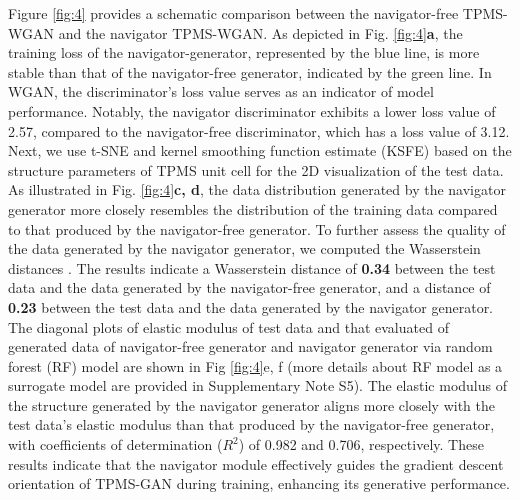 \documentclass[preprint,review,12pt,authoryear]{elsarticle}
\begin{document}
Figure \ref{fig:4} provides a schematic comparison between the navigator-free TPMS-WGAN and the navigator TPMS-WGAN. As depicted in Fig. \ref{fig:4}\textbf{a}, the training loss of the navigator-generator, represented by the blue line, is more stable than that of the navigator-free generator, indicated by the green line. In WGAN, the discriminator's loss value serves as an indicator of model performance. Notably, the navigator discriminator exhibits a lower loss value of 2.57, compared to the navigator-free discriminator, which has a loss value of 3.12. Next, we use t-SNE and kernel smoothing function estimate (KSFE) based on the structure parameters of TPMS unit cell for the 2D visualization of the test data. As illustrated in Fig. \ref{fig:4}\textbf{c, d}, the data distribution generated by the navigator generator more closely resembles the distribution of the training data compared to that produced by the navigator-free generator. To further assess the quality of the data generated by the navigator generator, we computed the Wasserstein distances \citep{Villani2008OptimalTO}. The results indicate a Wasserstein distance of \textbf{0.34} between the test data and the data generated by the navigator-free generator, and a distance of \textbf{0.23} between the test data and the data generated by the navigator generator. The diagonal plots of elastic modulus of test data and that evaluated of generated data of navigator-free generator and navigator generator via random forest (RF) model are shown in Fig \ref{fig:4}e, f (more details about RF model as a surrogate model are provided in Supplementary Note S5). The elastic modulus of the structure generated by the navigator generator aligns more closely with the test data's elastic modulus than that produced by the navigator-free generator, with coefficients of determination ($R^2$) of 0.982 and 0.706, respectively. These results indicate that the navigator module effectively guides the gradient descent orientation of TPMS-GAN during training, enhancing its generative performance.
\end{document}
